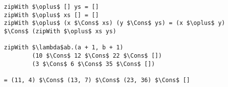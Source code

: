 \begin{frame}[t,fragile]
\vspace{35pt}


\begin{lstlisting}[mathescape=true,numbers=none]
zipWith $\oplus$ [] ys = []
zipWith $\oplus$ xs [] = []
zipWith $\oplus$ (x $\Cons$ xs) (y $\Cons$ ys) = (x $\oplus$ y) $\Cons$ (zipWith $\oplus$ xs ys)

zipWith $\lambda$ab.(a + 1, b + 1)
        (10 $\Cons$ 12 $\Cons$ 22 $\Cons$ [])
        (3 $\Cons$ 6 $\Cons$ 35 $\Cons$ [])

= (11, 4) $\Cons$ (13, 7) $\Cons$ (23, 36) $\Cons$ []
\end{lstlisting}

\end{frame}

